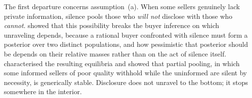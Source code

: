 The first departure concerns assumption~(a). When some sellers genuinely lack private
information, silence pools those who \emph{will not} disclose with those who \emph{cannot}.
\citet{dye_disclosure_1985} showed that this possibility breaks the buyer inference on which
unraveling depends, because a rational buyer confronted with silence must form a posterior over two
distinct populations, and how pessimistic that posterior should be depends on their relative
masses rather than on the act of silence itself. \citet{jung_kwon_1988} characterised the
resulting equilibria and showed that partial pooling, in which some informed sellers of poor
quality withhold while the uninformed are silent by necessity, is generically stable. Disclosure
does not unravel to the bottom; it stops somewhere in the interior.
